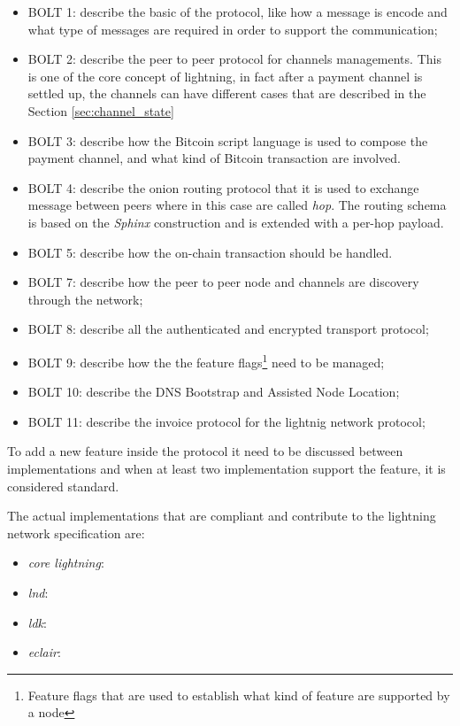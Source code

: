 \begin{itemize}
  \item BOLT 1: describe the basic of the protocol, like how a message is encode and what type of messages are required in order to support the communication;
  \item BOLT 2: describe the peer to peer protocol for channels managements. This is one of the core concept of lightning, in fact after a payment channel
        is settled up, the channels can have different cases that are described in the Section \ref{sec:channel_state}
  \item BOLT 3: describe how the Bitcoin script language is used to compose the
        payment channel, and what kind of Bitcoin transaction are involved.
  \item BOLT 4: describe the onion routing protocol that it is used to exchange message between peers where in this case are called \emph{hop}.
        The routing schema is based on the \emph{Sphinx}\cite{sphinx} construction and is extended with a per-hop payload.
  \item BOLT 5: describe how the on-chain transaction should be handled.
  \item BOLT 7: describe how the peer to peer node and channels are discovery through the network;
  \item BOLT 8: describe all the authenticated and encrypted transport protocol;
  \item BOLT 9: describe how the the feature flags\footnote{Feature flags that are used to establish what kind of feature are supported by a node} need to be managed;
  \item BOLT 10: describe the DNS Bootstrap and Assisted Node Location;
  \item BOLT 11: describe the invoice protocol for the lightnig network protocol;
\end{itemize}

To add a new feature inside the protocol it need to be discussed between implementations and when at least two implementation support the feature, it is considered standard.

The actual implementations that are compliant and contribute to the lightning network specification are:

\begin{itemize}
  \item \emph{core lightning}:
  \item \emph{lnd}:
  \item \emph{ldk}:
  \item \emph{eclair}:
\end{itemize}

